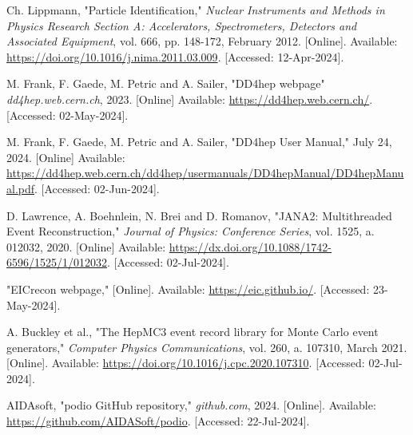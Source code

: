 \begin{thebibliography}{60}
     Ch. Lippmann, "Particle Identification," \textit{Nuclear Instruments and Methods in Physics Research Section A: Accelerators, Spectrometers, Detectors and Associated Equipment}, vol. 666, pp. 148-172, February 2012. [Online]. Available: \url{https://doi.org/10.1016/j.nima.2011.03.009}. [Accessed: 12-Apr-2024].

     M. Frank, F. Gaede, M. Petric and A. Sailer, "DD4hep webpage" \textit{dd4hep.web.cern.ch}, 2023. [Online] Available: \url{https://dd4hep.web.cern.ch/}. [Accessed: 02-May-2024].

     M. Frank, F. Gaede, M. Petric and A. Sailer, "DD4hep User Manual," July 24, 2024. [Online] Available: \url{https://dd4hep.web.cern.ch/dd4hep/usermanuals/DD4hepManual/DD4hepManual.pdf}. [Accessed: 02-Jun-2024].

     D. Lawrence, A. Boehnlein, N. Brei and D. Romanov, "JANA2: Multithreaded Event Reconstruction," \textit{Journal of Physics: Conference Series}, vol. 1525, a. 012032, 2020. [Online] Available: \url{https://dx.doi.org/10.1088/1742-6596/1525/1/012032}. [Accessed: 02-Jul-2024].

     "EICrecon webpage," [Online]. Available: \url{https://eic.github.io/}. [Accessed: 23-May-2024].

     A. Buckley et al., "The HepMC3 event record library for Monte Carlo event generators," \textit{Computer Physics Communications}, vol. 260, a. 107310, March 2021. [Online]. Available: \url{https://doi.org/10.1016/j.cpc.2020.107310}. [Accessed: 02-Jul-2024].

     AIDAsoft, "podio GitHub repository," \textit{github.com}, 2024. [Online]. Available: \url{https://github.com/AIDASoft/podio}. [Accessed: 22-Jul-2024].
     
\end{thebibliography}
